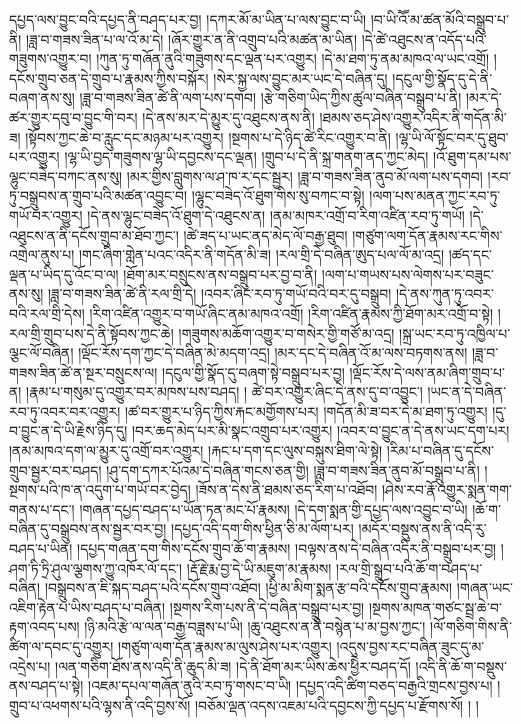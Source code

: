 དཔྱད་ལས་བྱུང་བའི་དཔྱད་ནི་བཤད་པར་བྱ། །དཀར་མོ་མ་ཡིན་པ་ལས་བྱུང་བ་ཡི། །བ་ཡི་འཽ་མ་ཚན་མོའི་བསྒྲུབ་པ་ནི། །ཟླ་བ་གཟས་ཟིན་པ་ལ་འོ་མ་དེ། །ཞོར་གྱུར་ན་ནི་འགྲུབ་པའི་མཚན་མ་ཡིན། །དེ་ཚེ་འཐུངས་ན་འདོད་པའི་གཟུགས་འགྱུར་བ། །ཀུན་ཏུ་གཞོན་ནུའི་གཟུགས་དང་ལྡན་པར་འགྱུར། །དེ་མ་ཐག་ཏུ་ནམ་མཁའ་ལ་ཡང་འགྲོ། །དངོས་གྲུབ་ཅན་དེ་གྲུབ་པ་རྣམས་ཀྱིས་བསྐོར། །སེར་སྐྱ་ལས་བྱུང་མར་ཡང་དེ་བཞིན་དུ། །དངུལ་གྱི་སྣོད་དུ་དེ་ནི་བཞག་ནས་སུ། །ཟླ་བ་གཟས་ཟིན་ཚེ་ནི་ལག་པས་དགབ། །རྩེ་གཅིག་ཡིད་ཀྱིས་ཚུལ་བཞིན་བསྒྲུབ་པ་ནི། །མར་དེ་ཚར་གྱུར་དབུ་བ་བྱུང་གི་བར། །དེ་ནས་མར་དེ་མྱུར་དུ་འཐུངས་ནས་ནི། །ཐམས་ཅད་ཤེས་འགྱུར་འདིར་ནི་གདོན་མི་ཟ། །སྟོབས་ཀྱང་ཆེ་བ་རླུང་དང་མཉམ་པར་འགྱུར། །སྔགས་པ་དེ་ཉིད་ཚེ་རིང་འགྱུར་བ་ནི། །ལྷ་ཡི་ལོ་སྟོང་བར་དུ་ཐུབ་པར་འགྱུར། །ལྷ་ཡི་བྱད་གཟུགས་ལྷ་ཡི་དབྱངས་དང་ལྡན། །གྲུབ་པ་དེ་ནི་སྐྲ་གནག་ནད་ཀྱང་མེད། །འོ་ཐུག་དམ་པས་ལྷུང་བཟེད་བཀང་ནས་སུ། །མར་གྱིས་བླུགས་ལ་ཤ་ཁ་ར་དང་སྦྱར། །ཟླ་བ་གཟས་ཟིན་ནུབ་མོ་ལག་པས་དགབ། །རབ་ཏུ་བསྒྲུབས་ན་གྲུབ་པའི་མཚན་འབྱུང་བ། །ལྷུང་བཟེད་འོ་ཐུག་གིས་སུ་བཀང་བ་སྟེ། །ལག་པས་མནན་ཀྱང་རབ་ཏུ་གཡོ་བར་འགྱུར། །དེ་ནས་ལྷུང་བཟེད་འོ་ཐུག་དེ་འཐུངས་ན། །ནམ་མཁར་འགྲོ་བ་རིག་འཛིན་རབ་ཏུ་གཡོ། །དེ་འཐུངས་ན་ནི་དངོས་གྲུབ་མ་ཐོབ་ཀྱང་། །ཚེ་ཟད་པ་ཡང་ནད་མེད་ལོ་བརྒྱ་ཐུབ། །གཙུག་ལག་དོན་རྣམས་རང་གིས་འགྲེལ་ནུས་པ། །གང་ཞིག་གླེན་པའང་འདིར་ནི་གདོན་མི་ཟ། །རལ་གྲི་དེ་བཞིན་ཨུད་པལ་ལོ་མ་འདྲ། །ཚད་དང་ལྡན་པ་ཡིད་དུ་འོང་བ་ལ། །ཐོག་མར་བསྲུངས་ནས་བསྒྲུབ་པར་བྱ་བ་ནི། །ལག་པ་གཡས་པས་ལེགས་པར་བཟུང་ནས་སུ། །ཟླ་བ་གཟས་ཟིན་ཚེ་ནི་རལ་གྲི་དེ། །འབར་ཞིང་རབ་ཏུ་གཡོ་བའི་བར་དུ་བསྒྲུབ། །དེ་ནས་ཀུན་ཏུ་འབར་བའི་རལ་གྲི་དེས། །རིག་འཛིན་འགྱུར་བ་གཡོ་ཞིང་ནམ་མཁའ་འགྲོ། །རིག་འཛིན་རྣམས་ཀྱི་ཐོག་མར་འགྲོ་བ་སྟེ། །རལ་གྲི་གྲུབ་པས་དེ་ནི་སྟོབས་ཀྱང་ཆེ། །གཟུགས་མཆོག་འགྱུར་བ་གསེར་གྱི་གཙོ་མ་འདྲ། །སྐྲ་ཡང་རབ་ཏུ་འཁྱིལ་པ་ལྕང་ལོ་བཞིན། །ལྡོང་རོས་དག་ཀྱང་དེ་བཞིན་མེ་མདག་འདྲ། །མར་དང་དེ་བཞིན་འོ་མ་ལས་བཏགས་ནས། །ཟླ་བ་གཟས་ཟིན་ཚེ་ན་སྔར་བསྲུངས་ལ། །དངུལ་གྱི་སྣོད་དུ་བཞག་སྟེ་བསྒྲུབ་པར་བྱ། །ལྡོང་རོས་དེ་ལས་ནམ་ཞིག་གྲུབ་པ་ན། །རྣམ་པ་གསུམ་དུ་འགྱུར་བར་མཁས་པས་བཤད། །
ཚེ་བར་འགྱུར་ཞིང་དེ་ནས་དུ་བ་འབྱུང་། །ཡང་ན་དེ་བཞིན་རབ་ཏུ་འབར་བར་འགྱུར། །ཚ་བར་གྱུར་པ་ཉིད་ཀྱིས་རྐང་མགྱོགས་པར། །གདོན་མི་ཟ་བར་དེ་མ་ཐག་ཏུ་འགྱུར། །དུ་བ་བྱུང་ན་དེ་ཡི་རྗེས་ཉིད་དུ། །བར་ཆད་མེད་པར་མི་སྣང་འགྲུབ་པར་འགྱུར། །འབར་བ་བྱུང་ན་དེ་ནས་ཡང་དག་པར། །ནམ་མཁའ་དག་ལ་མྱུར་དུ་འགྲོ་བར་འགྱུར། །རྐང་པ་དག་དང་ལུས་བསྐུས་ཐིག་ལེ་སྟེ། །རིམ་པ་བཞིན་དུ་དངོས་གྲུབ་སྦྱར་བར་བཤད། །ཤུ་དག་དཀར་པོའམ་དེ་བཞིན་གངས་ཅན་གྱི། །ཟླ་བ་གཟས་ཟིན་ནུབ་མོ་བསྒྲུབ་པ་ནི། །སྔགས་པའི་ཁ་ན་འདུག་པ་གཡོ་བར་བྱེད། །ཟོས་ན་དེས་ནི་ཐམས་ཅད་རིག་པ་འཐོབ། །ཤེས་རབ་རྣོ་འགྱུར་སྨན་གག་གནས་པ་དང་། །གཞན་དཔྱད་བཤད་པ་ཡོན་ཏན་མང་པོ་རྣམས། །དེ་དག་སྨན་གྱི་དཔྱད་ལས་འབྱུང་བ་ཡི། །ཆོ་ག་བཞིན་དུ་བསྒྲུབས་ནས་སྦྱར་བར་བྱ། །དཔྱད་འདི་དག་གིས་ཕྱིན་ཅི་མ་ལོག་པར། །མདོར་བསྡུས་ནས་ནི་འདི་རུ་བཤད་པ་ཡིན། །དཔྱད་གཞན་དག་གིས་དངོས་གྲུབ་ཆོ་ག་རྣམས། །བལྟས་ནས་དེ་བཞིན་འདིར་ནི་བསྒྲུབ་པར་བྱ། །ཤག་ཏི་ཏྲི་ཤུལ་ལྕགས་ཀྱུ་འཁོར་ལོ་དང་། །རྡོ་རྗེ་རྨ་བྱ་དེ་ཡི་མཇུག་མ་རྣམས། །རལ་གྲི་སྒྲུབ་པའི་ཆོ་ག་བཤད་པ་བཞིན། །བསྒྲུབས་ན་ཇི་སྐད་བཤད་པའི་དངོས་གྲུབ་འཐོབ། །ཕྱི་མ་མིག་སྨན་རྩ་བའི་དངོས་གྲུབ་རྣམས། །གཞན་ཡང་འཇིག་རྟེན་པ་ཡིས་བཤད་པ་བཞིན། །སྔགས་རིག་པས་ནི་དེ་བཞིན་བསྒྲུབ་པར་བྱ། །སྔགས་མཁན་གཙང་སྦྲ་ཆེ་བ་རྟག་འབད་པས། །ཉི་མའི་རྩེ་ལ་ལན་བརྒྱ་བཟླས་པ་ཡི། །ཆུ་འཐུངས་ན་ནི་བསྙེན་པ་མ་བྱས་ཀྱང་། །ལོ་གཅིག་གིས་ནི་ཚིག་ལ་དབང་དུ་འགྱུར། །གཙུག་ལག་དོན་རྣམས་མ་ལུས་ཤེས་པར་འགྱུར། །འདུས་བྱས་རང་བཞིན་ཟུང་དུ་མ་འདྲེས་པ། །ལན་གཅིག་ཐོས་ནས་འདི་ནི་ཆུད་མི་ཟ། །དེ་ནི་ཐོག་མར་ཡིས་ཆེས་ཕྱིེར་བཤད་དོ། །འདི་ནི་ཆོ་ག་བསྡུས་ནས་བཤད་པ་སྟེ། །འཇམ་དཔལ་གཞོན་ནུའི་རབ་ཏུ་གསང་བ་ཡི། །དཔྱད་འདི་ཚིག་བཅད་བརྒྱའི་གྲངས་བྱས་པ། །གྲུབ་པ་འཕགས་པའི་ལྷས་ནི་འདི་བྱས་སོ། །བཅོམ་ལྡན་འདས་འཇམ་པའི་དབྱངས་ཀྱི་དཔྱད་པ་རྫོགས་སོ། ། །